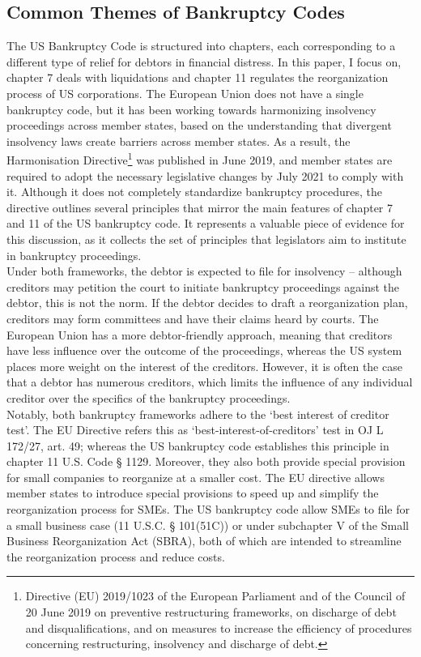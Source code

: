 \documentclass[12pt]{article}
\begin{document}
\subsection{Common Themes of Bankruptcy Codes}
The US Bankruptcy Code is structured into chapters, each corresponding to a different type of relief for debtors in financial distress. In this paper, I focus on, chapter 7 deals with liquidations and chapter 11 regulates the reorganization process of US corporations. The European Union does not have a single bankruptcy code, but it has been working towards harmonizing insolvency proceedings across member states, based on the understanding that divergent insolvency laws create barriers across member states. As a result, the Harmonisation Directive\footnote{Directive (EU) 2019/1023 of the European Parliament and of the Council of 20 June 2019 on preventive restructuring frameworks, on discharge of debt and disqualifications, and on measures to increase the efficiency of procedures concerning restructuring, insolvency and discharge of debt.}  was published in June 2019, and member states are required to adopt the necessary legislative changes by July 2021 to comply with it. Although it does not completely standardize bankruptcy procedures, the directive outlines several principles that mirror the main features of chapter 7 and 11 of the US bankruptcy code. It represents a valuable piece of evidence for this discussion, as it collects the set of principles that legislators aim to institute in bankruptcy proceedings. \vspace{3mm} \\
Under both frameworks, the debtor is expected to file for insolvency – although creditors may petition the court to initiate bankruptcy proceedings against the debtor, this is not the norm. If the debtor decides to draft a reorganization plan, creditors may form committees and have their claims heard by courts. The European Union has a more debtor-friendly approach, meaning that creditors have less influence over the outcome of the proceedings, whereas the US system places more weight on the interest of the creditors. However, it is often the case that a debtor has numerous creditors, which limits the influence of any individual creditor over the specifics of the bankruptcy proceedings. 
\vspace{3mm} \\
Notably, both bankruptcy frameworks adhere to the `best interest of creditor test'. The EU Directive refers this as ‘best-interest-of-creditors’ test in OJ L 172/27, art. 49; whereas the US bankruptcy code establishes this principle in chapter 11 U.S. Code § 1129. Moreover, they also both provide special provision for small companies to reorganize at a smaller cost. The EU directive allows member states to introduce special provisions to speed up and simplify the reorganization process for SMEs. The US bankruptcy code allow SMEs to file for a small business case (11 U.S.C. § 101(51C)) or under subchapter V of the Small Business Reorganization Act (SBRA), both of which are intended to streamline the reorganization process and reduce costs.
\end{document}
